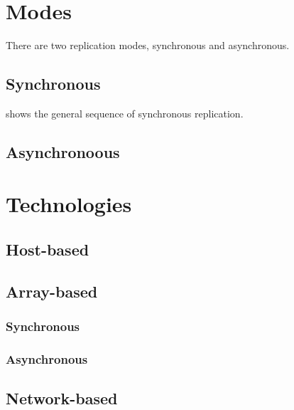 \section{Modes}\label{modes}

There are two replication modes, synchronous and asynchronous.

\subsection{Synchronous}\label{synchronous}

shows the general sequence of synchronous replication.

\subsection{Asynchronoous}\label{asynchronoous}

\section{Technologies}\label{technologies}

\subsection{Host-based}\label{host-based}

\subsection{Array-based}\label{array-based}

\subsubsection{Synchronous}\label{synchronous-1}

\subsubsection{Asynchronous}\label{asynchronous}

\subsection{Network-based}\label{network-based}
